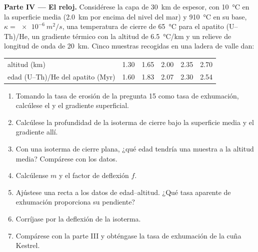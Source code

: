 \begin{problem}
\medskip\noindent\textbf{Parte IV --- El reloj.}
Considérese la capa de \qty{30}{km} de espesor, con \qty{10}{\celsius} en la superficie media
(\qty{2.0}{km} por encima del nivel del mar) y \qty{910}{\celsius} en su base, $\kappa
= \qty{e-6}{m^2/s}$, una temperatura de cierre de \qty{65}{\celsius} para el apatito
(U--Th)/He, un gradiente térmico con la altitud de \qty{6.5}{\celsius/km} y un relieve de
longitud de onda de \qty{20}{km}. Cinco muestras recogidas en una ladera de valle dan:
\begin{center}
\small
\begin{tabular}{lccccc}
\hline
altitud (\unit{km}) & 1.30 & 1.65 & 2.00 & 2.35 & 2.70 \\
edad (U--Th)/He del apatito (\unit{Myr}) & 1.60 & 1.83 & 2.07 & 2.30 & 2.54 \\
\hline
\end{tabular}
\end{center}
\begin{enumerate}[resume]
  \item Tomando la tasa de erosión de la pregunta 15 como tasa de exhumación, calcúlese
        el  y el gradiente superficial.
  \item Calcúlese la profundidad de la isoterma de cierre bajo la superficie media y
        el gradiente allí.
  \item Con una isoterma de cierre plana, ¿qué edad tendría una muestra a la altitud
        media? Compárese con los datos.
  \item Calcúlense $m$ y el factor de deflexión $f$.
  \item Ajústese una recta a los datos de edad--altitud. ¿Qué tasa aparente de
        exhumación proporciona su pendiente?
  \item Corríjase por la deflexión de la isoterma.
  \item Compárese con la parte III y obténgase la tasa de exhumación de la cuña
        Kestrel.
\end{enumerate}
\end{problem}
